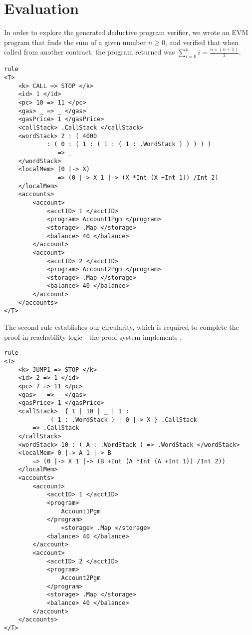 \section{Evaluation}
In order to explore the generated deductive program verifier, we wrote an EVM
program that finds the sum of a given number $n \geq 0 $, and verified that when called from another contract, the
program returned was $ \sum_{i = 0}^{n} i =  \frac{n \times  (n + 1 )}{2}$. 

\begin{verbatim}
rule
<T> 
    <k> CALL => STOP </k> 
    <id> 1 </id> 
    <pc> 10 => 11 </pc> 
    <gas> _ => _ </gas>
    <gasPrice> 1 </gasPrice> 
    <callStack> .CallStack </callStack> 
    <wordStack> 2 : ( 4000 
            : ( 0 : ( 1 : ( 1 : ( 1 : .WordStack ) ) ) ) ) 
               => _ 
    </wordStack> 
    <localMem> (0 |-> X) 
               => (0 |-> X 1 |-> (X *Int (X +Int 1)) /Int 2) 
    </localMem>
    <accounts>
        <account>     
            <acctID> 1 </acctID> 
            <program> Account1Pgm </program>
            <storage> .Map </storage>
            <balance> 40 </balance> 
        </account>
        <account>
            <acctID> 2 </acctID> 
            <program> Account2Pgm </program>
            <storage> .Map </storage>
            <balance> 40 </balance> 
        </account>
    </accounts>
</T>
\end{verbatim}


The second rule establishes our circularity, which is required to complete the proof in reachability logic - the proof system \K{} implements \cite{stefanescu-park-yuwen-li-rosu-2016-oopsla}. 
\begin{verbatim}
rule
<T> 
    <k> JUMP1 => STOP </k> 
    <id> 2 => 1 </id> 
    <pc> 7 => 11 </pc> 
    <gas> _ => _ </gas>
    <gasPrice> 1 </gasPrice> 
    <callStack>  { 1 | 10 | _ | 1 : 
             ( 1 : .WordStack ) | 0 |-> X } .CallStack
        => .CallStack  
    </callStack> 
    <wordStack> 10 : ( A : .WordStack ) => .WordStack </wordStack>
    <localMem> 0 |-> A 1 |-> B 
        => (0 |-> X 1 |-> (B +Int (A *Int (A +Int 1)) /Int 2)) 
    </localMem>
    <accounts>
        <account>     
            <acctID> 1 </acctID> 
            <program>
                Account1Pgm 
            </program>
                <storage> .Map </storage>
            <balance> 40 </balance> 
        </account>
        <account>
            <acctID> 2 </acctID> 
            <program> 
                Account2Pgm
            </program>  
            <storage> .Map </storage>
            <balance> 40 </balance> 
        </account>
    </accounts>
</T>

\end{verbatim}

